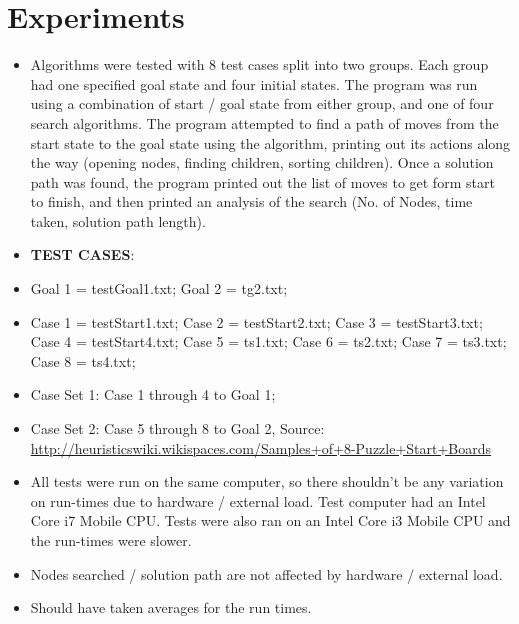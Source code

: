 \documentclass[12pt]{article}
\begin{document}
\section{Experiments}
\begin{itemize}
	\item Algorithms were tested with 8 test cases split into two groups. Each group had one specified goal state and four initial states. The program was run using a combination of start / goal state from either group, and one of four search algorithms. The program attempted to find a path of moves from the start state to the goal state using the algorithm, printing out its actions along the way (opening nodes, finding children, sorting children). Once a solution path was found, the program printed out the list of moves to get form start to finish, and then printed an analysis of the search (No. of Nodes, time taken, solution path length).
	\item \textbf{TEST CASES}: 
	\item Goal 1 = testGoal1.txt; Goal 2 = tg2.txt;
	\item Case 1 = testStart1.txt; Case 2 = testStart2.txt; Case 3 = testStart3.txt; Case 4 = testStart4.txt; Case 5 = ts1.txt; Case 6 = ts2.txt; Case 7 = ts3.txt; Case 8 = ts4.txt;
	\item Case Set 1: Case 1 through 4 to Goal 1; 
	\item Case Set 2: Case 5 through 8 to Goal 2, Source: \url{http://heuristicswiki.wikispaces.com/Samples+of+8-Puzzle+Start+Boards}
	\item All tests were run on the same computer, so there shouldn't be any variation on run-times due to hardware / external load. Test computer had an Intel Core i7 Mobile CPU. Tests were also ran on an Intel Core i3 Mobile CPU and the run-times were slower. 
	\item Nodes searched / solution path are not affected by hardware / external load.
	\item Should have taken averages for the run times.
\end{itemize}
\end{document}
